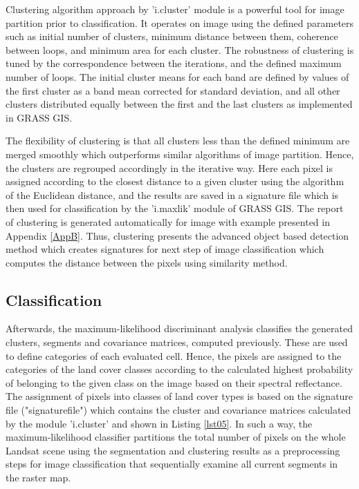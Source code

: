 \documentclass[analytics,article,submit,pdftex,moreauthors]{Definitions/mdpi}
\begin{document}
Clustering algorithm approach by 'i.cluster' module is a powerful tool for image partition prior to classification. It operates on image using the defined parameters such as initial number of clusters, minimum distance between them, coherence between loops, and minimum area for each cluster. The robustness of clustering is tuned by the correspondence between the iterations, and the defined maximum number of loops. The initial cluster means for each band are defined by values of the first cluster as a band mean corrected for standard deviation, and all other clusters distributed equally between the first and the last clusters as implemented in GRASS GIS. 

The flexibility of clustering is that all clusters less than the defined minimum are merged smoothly which outperforms similar algorithms of image partition. Hence, the clusters are regrouped accordingly in the iterative way. Here each pixel is assigned according to the closest distance to a given cluster using the algorithm of the Euclidean distance, and the results are saved in a signature file which is then used for classification by the 'i.maxlik' module of GRASS GIS. The report of clustering is generated automatically for image with example presented in Appendix \ref{AppB}. Thus, clustering presents the advanced object based detection method which creates signatures for next step of image classification which computes the distance between the pixels using similarity method.

\subsection{Classification}
Afterwards, the maximum-likelihood discriminant analysis classifies the generated clusters, segments and covariance matrices, computed previously. These are used to define categories of each evaluated cell. Hence, the pixels are assigned to the categories of the land cover classes according to the calculated highest probability of belonging to the given class on the image based on their spectral reflectance. The assignment of pixels into classes of land cover types is based on the signature file ("signaturefile") which contains the cluster and covariance matrices calculated by the module 'i.cluster' and shown in Listing \ref{lst05}. In such a way, the maximum-likelihood classifier partitions the total number of pixels on the whole Landsat scene using the segmentation and clustering results as a preprocessing steps for image classification that sequentially examine all current segments in the raster map. 
\end{document}
